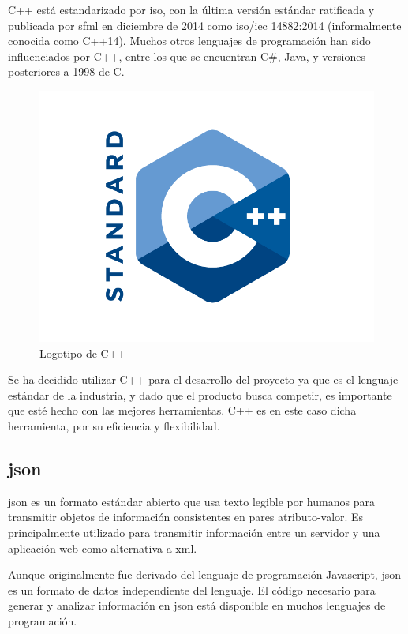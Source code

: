 		C++ está estandarizado por \acrshort{iso}, con la última versión estándar ratificada y publicada por \acrshort{sfml} en diciembre de 2014 como \acrshort{iso}/\acrshort{iec} 14882:2014 (informalmente conocida como C++14). Muchos otros lenguajes de programación han sido influenciados por C++, entre los que se encuentran C\#, Java, y versiones posteriores a 1998 de C.

		\begin{figure}[!htp]
			 \centering
			 \includegraphics[scale=.25]{fig/cpp}
			 \caption{Logotipo de C++}
			 \label{fig:cpp}
		\end{figure}

		\FloatBarrier

		Se ha decidido utilizar C++ para el desarrollo del proyecto ya que es el lenguaje estándar de la industria, y dado que el producto busca competir, es importante que esté hecho con las mejores herramientas. C++ es en este caso dicha herramienta, por su eficiencia y flexibilidad.

	\subsection{\acrshort{json}}

		\acrfull{json} es un formato estándar abierto que usa texto legible por humanos para transmitir objetos de información consistentes en pares atributo-valor. Es principalmente utilizado para transmitir información entre un servidor y una aplicación web como alternativa a \acrshort{xml}.

		Aunque originalmente fue derivado del lenguaje de programación Javascript, \acrshort{json} es un formato de datos independiente del lenguaje. El código necesario para generar y analizar información en \acrshort{json} está disponible en muchos lenguajes de programación.


